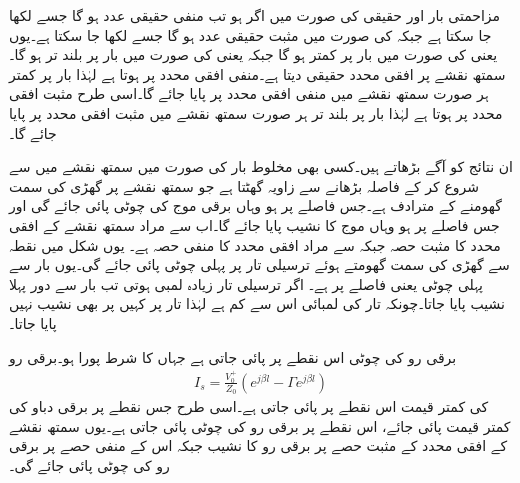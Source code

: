 مزاحمتی بار  اور حقیقی  کی صورت میں اگر  ہو تب  منفی حقیقی عدد ہو گا جسے   لکھا جا سکتا ہے جبکہ  کی صورت میں  مثبت حقیقی عدد ہو گا جسے   لکھا جا سکتا ہے۔یوں  یعنی  کی صورت میں بار پر کمتر  ہو گا جبکہ  یعنی  کی صورت میں بار پر بلند تر  ہو گا۔سمتھ نقشے پر افقی محدد حقیقی  دیتا ہے۔منفی افقی محدد پر   ہوتا ہے لہٰذا بار پر کمتر  ہر صورت سمتھ نقشے میں منفی افقی محدد پر پایا جائے گا۔اسی طرح مثبت افقی محدد پر   ہوتا ہے لہٰذا بار پر بلند تر  ہر صورت سمتھ نقشے میں مثبت افقی محدد پر پایا جائے گا۔

ان نتائج کو آگے بڑھاتے ہیں۔کسی بھی مخلوط بار  کی صورت میں سمتھ نقشے میں  سے شروع کر کے فاصلہ  بڑھانے سے زاویہ  گھٹتا ہے جو سمتھ نقشے پر گھڑی کی سمت گھومنے کے مترادف ہے۔جس فاصلے پر  ہو وہاں برقی موج کی چوٹی پائی جائے گی اور جس فاصلے پر  ہو وہاں موج کا نشیب پایا جائے گا۔اب  سے مراد سمتھ نقشے کے افقی محدد کا مثبت حصہ جبکہ
  سے مراد افقی محدد کا منفی حصہ ہے۔ یوں شکل  میں نقطہ  سے گھڑی کی سمت  گھومتے ہوئے  ترسیلی تار پر پہلی چوٹی پائی جائے گی۔یوں بار سے پہلی چوٹی  یعنی  فاصلے پر ہے۔ اگر ترسیلی تار زیادہ لمبی ہوتی تب بار سے  دور پہلا نشیب پایا جاتا۔چونکہ تار کی لمبائی اس سے کم ہے لہٰذا تار پر کہیں پر بھی نشیب نہیں پایا جاتا۔

برقی رو کی چوٹی اس نقطے پر پائی جاتی ہے جہاں  کا شرط پورا ہو۔برقی رو
\begin{align*}
I_s=\frac{V_0^+}{Z_0} \left (e^{j \beta l}-\Gamma e^{j \beta l} \right)
\end{align*}
کی کمتر قیمت اس نقطے پر پائی جاتی ہے۔اسی طرح جس نقطے پر برقی دباو کی کمتر قیمت پائی جائے، اس نقطے پر برقی رو کی چوٹی پائی جاتی ہے۔یوں سمتھ نقشے کے افقی محدد کے مثبت حصے پر برقی رو کا نشیب جبکہ اس کے منفی حصے پر برقی رو کی چوٹی پائی جائے گی۔

